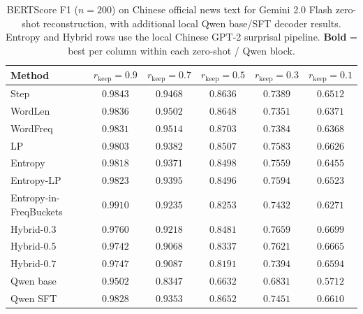 \documentclass[11pt]{article}
\newcommand{\rkeep}{r_{\mathrm{keep}}}
\begin{document}
\begin{table}[tbp]
\centering
\small
\caption{BERTScore F1 ($n=200$) on Chinese official news text
for Gemini 2.0 Flash zero-shot reconstruction, with additional local Qwen
base/SFT decoder results.
Entropy and Hybrid rows use the local Chinese GPT-2 surprisal pipeline.
\textbf{Bold} = best per column within each zero-shot / Qwen block.}
\label{tab:chinese_bertscore}
\begin{tabular}{lccccc}
\toprule
\textbf{Method} & $\rkeep{=}0.9$ & $\rkeep{=}0.7$ & $\rkeep{=}0.5$ & $\rkeep{=}0.3$ & $\rkeep{=}0.1$ \\
\midrule
Step              & $0.9843$ & $0.9468$ & $0.8636$ & $0.7389$ & $0.6512$ \\
WordLen       & $0.9836$ & $0.9502$ & $0.8648$ & $0.7351$ & $0.6371$ \\
WordFreq    & $0.9831$ & $\mathbf{0.9514}$ & $\mathbf{0.8703}$ & $0.7384$ & $0.6368$ \\
LP   & $0.9803$ & $0.9382$ & $0.8507$ & $0.7583$ & $0.6626$ \\
Entropy                 & $0.9818$ & $0.9371$ & $0.8498$ & $0.7559$ & $0.6455$ \\
Entropy-LP              & $0.9823$ & $0.9395$ & $0.8496$ & $0.7594$ & $0.6523$ \\
Entropy-in-FreqBuckets  & $\mathbf{0.9910}$ & $0.9235$ & $0.8253$ & $0.7432$ & $0.6271$ \\
Hybrid-$0.3$            & $0.9760$ & $0.9218$ & $0.8481$ & $\mathbf{0.7659}$ & $\mathbf{0.6699}$ \\
Hybrid-$0.5$            & $0.9742$ & $0.9068$ & $0.8337$ & $0.7621$ & $0.6665$ \\
Hybrid-$0.7$            & $0.9747$ & $0.9087$ & $0.8191$ & $0.7394$ & $0.6594$ \\
\midrule
Qwen base              & $0.9502$ & $0.8347$ & $0.6632$ & $0.6831$ & $0.5712$ \\
Qwen SFT               & $\mathbf{0.9828}$ & $\mathbf{0.9353}$ & $\mathbf{0.8652}$ & $\mathbf{0.7451}$ & $\mathbf{0.6610}$ \\
\bottomrule
\end{tabular}
\end{table}
\end{document}
